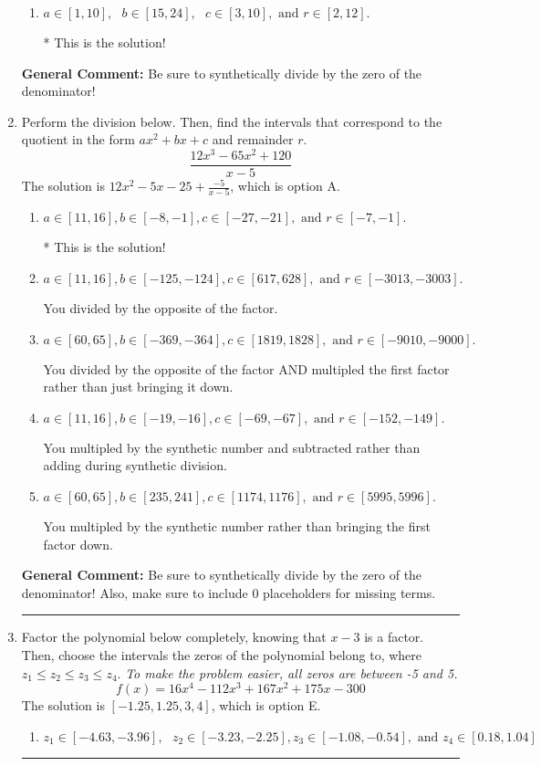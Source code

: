 \documentclass{extbook}[14pt]
\newcommand{\litem}[1]{\item #1

\rule{\textwidth}{0.4pt}}
\begin{document}
\begin{enumerate}
{\begin{enumerate}[label=\Alph*.]
 You multiplied by the synthetic number and subtracted rather than adding during synthetic division.
\item \( a \in [1, 10], \text{   } b \in [15, 24], \text{   } c \in [3, 10], \text{   and   } r \in [2, 12]. \)

* This is the solution!
\end{enumerate}

\textbf{General Comment:} Be sure to synthetically divide by the zero of the denominator!
}
\litem{
Perform the division below. Then, find the intervals that correspond to the quotient in the form $ax^2+bx+c$ and remainder $r$.
\[ \frac{12x^{3} -65 x^{2} + 120}{x -5} \]The solution is \( 12x^{2} -5 x -25 + \frac{-5}{x -5} \), which is option A.\begin{enumerate}[label=\Alph*.]
\item \( a \in [11, 16], b \in [-8, -1], c \in [-27, -21], \text{ and } r \in [-7, -1]. \)

* This is the solution!
\item \( a \in [11, 16], b \in [-125, -124], c \in [617, 628], \text{ and } r \in [-3013, -3003]. \)

 You divided by the opposite of the factor.
\item \( a \in [60, 65], b \in [-369, -364], c \in [1819, 1828], \text{ and } r \in [-9010, -9000]. \)

 You divided by the opposite of the factor AND multipled the first factor rather than just bringing it down.
\item \( a \in [11, 16], b \in [-19, -16], c \in [-69, -67], \text{ and } r \in [-152, -149]. \)

 You multipled by the synthetic number and subtracted rather than adding during synthetic division.
\item \( a \in [60, 65], b \in [235, 241], c \in [1174, 1176], \text{ and } r \in [5995, 5996]. \)

 You multipled by the synthetic number rather than bringing the first factor down.
\end{enumerate}

\textbf{General Comment:} Be sure to synthetically divide by the zero of the denominator! Also, make sure to include 0 placeholders for missing terms.
}
\litem{
Factor the polynomial below completely, knowing that $x -3$ is a factor. Then, choose the intervals the zeros of the polynomial belong to, where $z_1 \leq z_2 \leq z_3 \leq z_4$. \textit{To make the problem easier, all zeros are between -5 and 5.}
\[ f(x) = 16x^{4} -112 x^{3} +167 x^{2} +175 x -300 \]The solution is \( [-1.25, 1.25, 3, 4] \), which is option E.\begin{enumerate}[label=\Alph*.]
\item \( z_1 \in [-4.63, -3.96], \text{   }  z_2 \in [-3.23, -2.25], z_3 \in [-1.08, -0.54], \text{   and   } z_4 \in [0.18, 1.04] \)


\end{enumerate}}
\end{enumerate}
\end{document}

